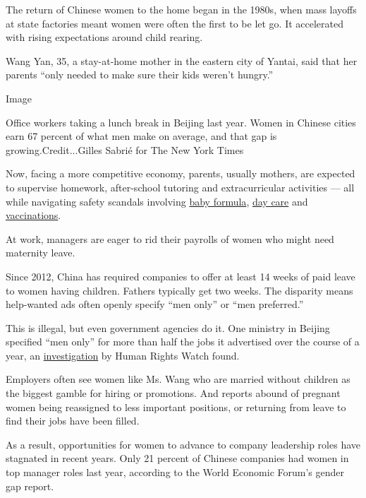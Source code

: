 The return of Chinese women to the home began in the 1980s, when mass
layoffs at state factories meant women were often the first to be let
go. It accelerated with rising expectations around child rearing.

Wang Yan, 35, a stay-at-home mother in the eastern city of Yantai, said
that her parents ``only needed to make sure their kids weren't hungry.''

Image

Office workers taking a lunch break in Beijing last year. Women in
Chinese cities earn 67 percent of what men make on average, and that gap
is growing.Credit...Gilles Sabrié for The New York Times

Now, facing a more competitive economy, parents, usually mothers, are
expected to supervise homework, after-school tutoring and
extracurricular activities --- all while navigating safety scandals
involving
\href{https://www.nytimes.com/2013/07/26/world/asia/chinas-search-for-infant-formula-goes-global.html}{baby
formula},
\href{https://www.nytimes.com/2017/11/24/world/asia/beijing-kindergarten-abuse.html}{day
care} and
\href{https://www.nytimes.com/2018/07/23/world/asia/china-vaccines-scandal-investigation.html}{vaccinations}.

At work, managers are eager to rid their payrolls of women who might
need maternity leave.

Since 2012, China has required companies to offer at least 14 weeks of
paid leave to women having children. Fathers typically get two weeks.
The disparity means help-wanted ads often openly specify ``men only'' or
``men preferred.''

This is illegal, but even government agencies do it. One ministry in
Beijing specified ``men only'' for more than half the jobs it advertised
over the course of a year, an
\href{https://www.hrw.org/report/2018/04/23/only-men-need-apply/gender-discrimination-job-advertisements-china}{investigation}
by Human Rights Watch found.

Employers often see women like Ms. Wang who are married without children
as the biggest gamble for hiring or promotions. And reports abound of
pregnant women being reassigned to less important positions, or
returning from leave to find their jobs have been filled.

As a result, opportunities for women to advance to company leadership
roles have stagnated in recent years. Only 21 percent of Chinese
companies had women in top manager roles last year, according to the
World Economic Forum's gender gap report.

